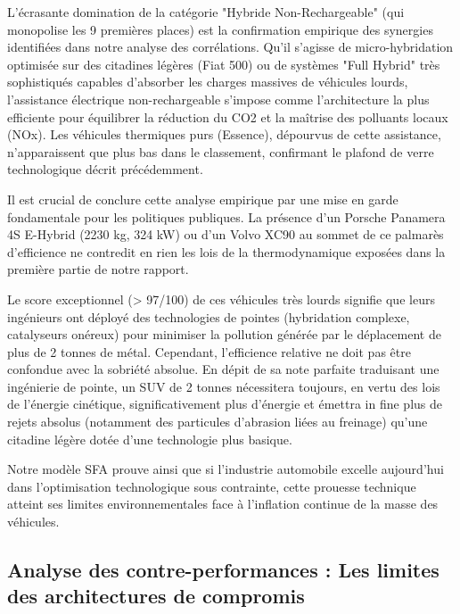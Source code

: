 \vspace{0.6em}

L'écrasante domination de la catégorie "Hybride Non-Rechargeable" (qui monopolise les 9 premières places) est la confirmation empirique des synergies identifiées dans notre analyse des corrélations. Qu'il s'agisse de micro-hybridation optimisée sur des citadines légères (Fiat 500) ou de systèmes "Full Hybrid" très sophistiqués capables d'absorber les charges massives de véhicules lourds, l'assistance électrique non-rechargeable s'impose comme l'architecture la plus efficiente pour équilibrer la réduction du CO2 et la maîtrise des polluants locaux (NOx). Les véhicules thermiques purs (Essence), dépourvus de cette assistance, n'apparaissent que plus bas dans le classement, confirmant le plafond de verre technologique décrit précédemment.

\vspace{0.6em}

Il est crucial de conclure cette analyse empirique par une mise en garde fondamentale pour les politiques publiques. La présence d'un Porsche Panamera 4S E-Hybrid (2230 kg, 324 kW) ou d'un Volvo XC90 au sommet de ce palmarès d'efficience ne contredit en rien les lois de la thermodynamique exposées dans la première partie de notre rapport.

Le score exceptionnel (> 97/100) de ces véhicules très lourds signifie que leurs ingénieurs ont déployé des technologies de pointes (hybridation complexe, catalyseurs onéreux) pour minimiser la pollution générée par le déplacement de plus de 2 tonnes de métal. Cependant, l'efficience relative ne doit pas être confondue avec la sobriété absolue. En dépit de sa note parfaite traduisant une ingénierie de pointe, un SUV de 2 tonnes nécessitera toujours, en vertu des lois de l'énergie cinétique, significativement plus d'énergie et émettra in fine plus de rejets absolus (notamment des particules d'abrasion liées au freinage) qu'une citadine légère dotée d'une technologie plus basique.

Notre modèle SFA prouve ainsi que si l'industrie automobile excelle aujourd'hui dans l'optimisation technologique sous contrainte, cette prouesse technique atteint ses limites environnementales face à l'inflation continue de la masse des véhicules.

\subsection{Analyse des contre-performances : Les limites des architectures de compromis}

